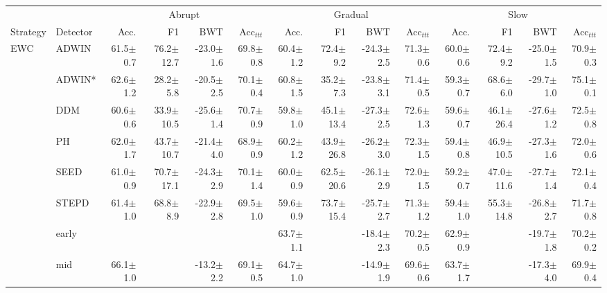 \begin{tabular}{llrrrrrrrrrrrr}
\toprule
 & & \multicolumn{4}{c}{Abrupt} & \multicolumn{4}{c}{Gradual} & \multicolumn{4}{c}{Slow} \\
\cmidrule(lr){3-6}\cmidrule(lr){7-10}\cmidrule(lr){11-14}
Strategy & Detector & Acc. & F1 & BWT & Acc$_{ttt}$ & Acc. & F1 & BWT & Acc$_{ttt}$ & Acc. & F1 & BWT & Acc$_{ttt}$ \\
\midrule
\multirow[t]{9}{*}{EWC} & ADWIN & 61.5\tiny{$\pm$0.7} & 76.2\tiny{$\pm$12.7} & -23.0\tiny{$\pm$1.6} & 69.8\tiny{$\pm$0.8} & 60.4\tiny{$\pm$1.2} & 72.4\tiny{$\pm$9.2} & -24.3\tiny{$\pm$2.5} & 71.3\tiny{$\pm$0.6} & 60.0\tiny{$\pm$0.6} & 72.4\tiny{$\pm$9.2} & -25.0\tiny{$\pm$1.5} & 70.9\tiny{$\pm$0.3} \\
 & ADWIN* & 62.6\tiny{$\pm$1.2} & 28.2\tiny{$\pm$5.8} & -20.5\tiny{$\pm$2.5} & 70.1\tiny{$\pm$0.4} & 60.8\tiny{$\pm$1.5} & 35.2\tiny{$\pm$7.3} & -23.8\tiny{$\pm$3.1} & 71.4\tiny{$\pm$0.5} & 59.3\tiny{$\pm$0.7} & 68.6\tiny{$\pm$6.0} & -29.7\tiny{$\pm$1.0} & 75.1\tiny{$\pm$0.1} \\
 & DDM & 60.6\tiny{$\pm$0.6} & 33.9\tiny{$\pm$10.5} & -25.6\tiny{$\pm$1.4} & 70.7\tiny{$\pm$0.9} & 59.8\tiny{$\pm$1.0} & 45.1\tiny{$\pm$13.4} & -27.3\tiny{$\pm$2.5} & 72.6\tiny{$\pm$1.3} & 59.6\tiny{$\pm$0.7} & 46.1\tiny{$\pm$26.4} & -27.6\tiny{$\pm$1.2} & 72.5\tiny{$\pm$0.8} \\
 & PH & 62.0\tiny{$\pm$1.7} & 43.7\tiny{$\pm$10.7} & -21.4\tiny{$\pm$4.0} & 68.9\tiny{$\pm$0.9} & 60.2\tiny{$\pm$1.2} & 43.9\tiny{$\pm$26.8} & -26.2\tiny{$\pm$3.0} & 72.3\tiny{$\pm$1.5} & 59.4\tiny{$\pm$0.8} & 46.9\tiny{$\pm$10.5} & -27.3\tiny{$\pm$1.6} & 72.0\tiny{$\pm$0.6} \\
 & SEED & 61.0\tiny{$\pm$0.9} & 70.7\tiny{$\pm$17.1} & -24.3\tiny{$\pm$2.9} & 70.1\tiny{$\pm$1.4} & 60.0\tiny{$\pm$0.9} & 62.5\tiny{$\pm$20.6} & -26.1\tiny{$\pm$2.9} & 72.0\tiny{$\pm$1.5} & 59.2\tiny{$\pm$0.7} & 47.0\tiny{$\pm$11.6} & -27.7\tiny{$\pm$1.4} & 72.1\tiny{$\pm$0.4} \\
 & STEPD & 61.4\tiny{$\pm$1.0} & 68.8\tiny{$\pm$8.9} & -22.9\tiny{$\pm$2.8} & 69.5\tiny{$\pm$1.0} & 59.6\tiny{$\pm$0.9} & 73.7\tiny{$\pm$15.4} & -25.7\tiny{$\pm$2.7} & 71.3\tiny{$\pm$1.2} & 59.4\tiny{$\pm$1.0} & 55.3\tiny{$\pm$14.8} & -26.8\tiny{$\pm$2.7} & 71.7\tiny{$\pm$0.8} \\
 & early &  &  &  &  & 63.7\tiny{$\pm$1.1} &  & -18.4\tiny{$\pm$2.3} & 70.2\tiny{$\pm$0.5} & 62.9\tiny{$\pm$0.9} &  & -19.7\tiny{$\pm$1.8} & 70.2\tiny{$\pm$0.2} \\
 & mid & 66.1\tiny{$\pm$1.0} &  & -13.2\tiny{$\pm$2.2} & 69.1\tiny{$\pm$0.5} & 64.7\tiny{$\pm$1.0} &  & -14.9\tiny{$\pm$1.9} & 69.6\tiny{$\pm$0.6} & 63.7\tiny{$\pm$1.7} &  & -17.3\tiny{$\pm$4.0} & 69.9\tiny{$\pm$0.4} \\

\end{tabular}
